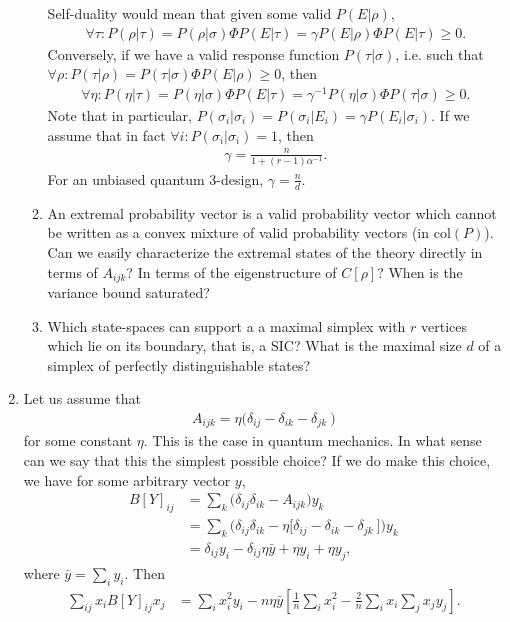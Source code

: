 \documentclass[11pt]{article}
\begin{document}
\begin{enumerate}
\begin{enumerate}
 Self-duality would mean that given some valid $P(E|\rho)$,
 \begin{align}
\forall \tau: P(\rho|\tau)=P(\rho|\sigma)\Phi P(E|\tau)=\gamma P(E|\rho)	\Phi P(E|\tau)\ge0.
 \end{align}
Conversely, if we have a valid response function $P(\tau|\sigma)$, i.e. such that $\forall \rho: P(\tau|\rho)=P(\tau|\sigma)\Phi P(E|\rho)\ge0$, then 
\begin{align}
	\forall \eta:P(\eta|\tau)=P(\eta|\sigma)\Phi P(E|\tau)=\gamma^{-1}P(\eta|\sigma)\Phi P(\tau|\sigma)\ge0.
\end{align}
Note that in particular, $P(\sigma_i|\sigma_i)=P(\sigma_i|E_i)=\gamma P(E_i|\sigma_i)$. If we assume that in fact $\forall i: P(\sigma_i|\sigma_i)=1$, then
\begin{align}
\gamma = \frac{n}{1+(r-1)\alpha^{-1}}.
\end{align}
For an unbiased quantum 3-design, $\gamma=\frac{n}{d}$.
\item An extremal probability vector is a valid probability vector which cannot be written as a convex mixture of valid probability vectors (in $\text{col}(P)$). Can we easily characterize the extremal states of the theory directly in terms of $A_{ijk}$? In terms of the eigenstructure of $C[\rho]$? When is the variance bound saturated?
\item Which state-spaces can support a a maximal simplex with $r$ vertices which lie on its boundary, that is, a SIC? What is the maximal size $d$ of a simplex of perfectly distinguishable states?
 \end{enumerate}
\item Let us assume that 
\begin{align}
A_{ijk} = 	\eta \Big(\delta_{ij}-\delta_{ik}-\delta_{jk}\ \Big)
\end{align}
for some constant $\eta$. This is the case in quantum mechanics. In what sense can we say that this the simplest possible choice? If we do make this choice, we  have for some arbitrary vector $y$,
\begin{align}
B[Y]_{ij}&=	\sum_k \Big(\delta_{ij}\delta_{ik}-A_{ijk}\Big)y_k\\
&=\sum_k \Big(\delta_{ij}\delta_{ik}-\eta \Big[\delta_{ij}-\delta_{ik}-\delta_{jk}\ \Big]\Big)y_k\\
&=\delta_{ij}y_i-\delta_{ij}\eta \bar{y}+\eta y_i+\eta y_j,
\end{align}
where $\bar{y}=\sum_i y_i$. Then
\begin{align}
\sum_{ij}x_iB[Y]_{ij}x_j&=\sum_i x_i^2 y_i-n\eta\bar{y}\left[\frac{1}{n}\sum_i x_i^2 -\frac{2}{n}\sum_ix_i\sum_j x_j y_j\right].

\end{align}
\end{enumerate}
\end{document}
